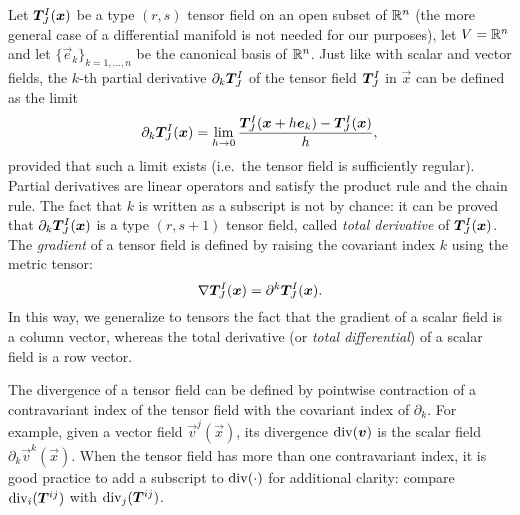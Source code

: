 Let $\bm{T}^I_J(\bm{x})$ be a type $(r,s)$ tensor field on an open subset
of $\mathbb{R}^n$ (the more general case of a differential manifold
is not needed for our purposes), let $V = \mathbb{R}^n$ and
let $\{\vec{e}_k\}_{k = 1,\dots,n}$ be the canonical basis of $\mathbb{R}^n$.
Just like with scalar and vector fields, the $k$-th partial derivative
$\partial_k \bm{T}^I_J$ of the tensor field $\bm{T}^I_J$ in $\vec{x}$
can be defined as the limit
\[
\partial_k \bm{T}^I_J(\bm{x})
= \lim_{h \to 0} \frac{
	\bm{T}^I_J(\bm{x}+h\bm{e}_k) - \bm{T}^I_J(\bm{x})
	}{h},
\]
provided that such a limit exists (i.e.\ the tensor field is sufficiently
regular). Partial derivatives are linear operators and satisfy the product
rule and the chain rule. The fact that $k$ is written as a subscript
is not by chance: it can be proved that $\partial_k \bm{T}^I_J(\bm{x})$
is a type $(r,s+1)$ tensor field, called \emph{total derivative}
of $\bm{T}^I_J(\bm{x})$. The \emph{gradient} of a tensor field is
defined by raising the covariant index $k$ using the metric tensor:
\[
\nabla \bm{T}^I_J(\bm{x}) = \partial^k \bm{T}^I_J(\bm{x}).
\]
In this way, we generalize to tensors the fact that the gradient of
a scalar field is a column vector, whereas the total derivative
(or \emph{total differential}) of a scalar field is a row vector.

The divergence of a tensor field can be defined by pointwise
contraction of a contravariant index of the tensor field with
the covariant index of $\partial_k$. For example, given a vector
field $\vec{v}^j(\vec{x})$, its divergence $\operatorname{div}(\bm{v})$
is the scalar field $\partial_k \vec{v}^k(\vec{x})$.
When the tensor field has more than one contravariant index, it is good
practice to add a subscript to $\operatorname{div}(\cdot)$ for additional clarity:
compare $\operatorname{div}_i(\bm{T}^{ij})$ with $\operatorname{div}_j(\bm{T}^{ij})$.



















